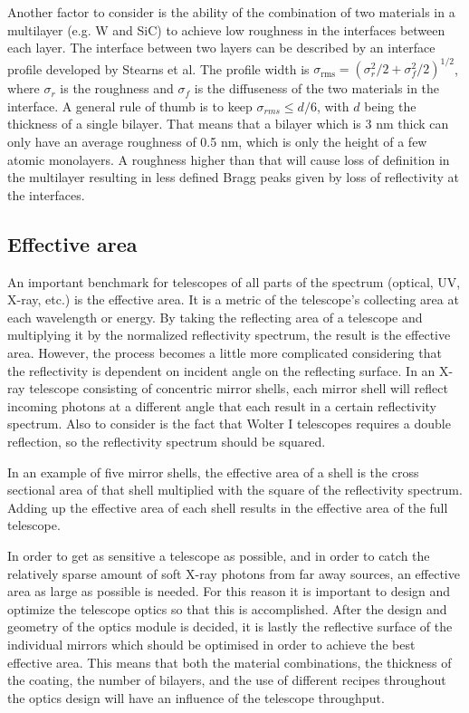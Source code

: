 Another factor to consider is the ability of the combination of two materials in a multilayer (e.g. W and SiC) to achieve low roughness in the interfaces between each layer. The interface between two layers can be described by an interface profile developed by Stearns et al\cite{Stearns:1989va}. The profile width is $\sigma_{\text{rms}}=(\sigma_r^2/2 + \sigma_f^2/2)^{1/2}$, where $\sigma_r$ is the roughness and $\sigma_f$ is the diffuseness of the two materials in the interface. A general rule of thumb is to keep $\sigma_{rms} \leq d/6$, with $d$ being the thickness of a single bilayer. That means that a bilayer which is 3 nm thick can only have an average roughness of 0.5 nm, which is only the height of a few atomic monolayers. A roughness higher than that will cause loss of definition in the multilayer resulting in less defined Bragg peaks given by loss of reflectivity at the interfaces.

\subsection{Effective area}\label{sec:eff_area}
An important benchmark for telescopes of all parts of the spectrum (optical, UV, X-ray, etc.) is the effective area. It is a metric of the telescope's collecting area at each wavelength or energy. By taking the reflecting area of a telescope and multiplying it by the normalized reflectivity spectrum, the result is the effective area. However, the process becomes a little more complicated considering that the reflectivity is dependent on incident angle on the reflecting surface. In an X-ray telescope consisting of concentric mirror shells, each mirror shell will reflect incoming photons at a different angle that each result in a certain reflectivity spectrum. Also to consider is the fact that Wolter I telescopes requires a double reflection, so the reflectivity spectrum should be squared.

In an example of five mirror shells, the effective area of a shell is the cross sectional area of that shell multiplied with the square of the reflectivity spectrum. Adding up the effective area of each shell results in the effective area of the full telescope.

In order to get as sensitive a telescope as possible, and in order to catch the relatively sparse amount of soft X-ray photons from far away sources, an effective area as large as possible is needed. For this reason it is important to design and optimize the telescope optics so that this is accomplished. After the design and geometry of the optics module is decided, it is lastly the reflective surface of the individual mirrors which should be optimised in order to achieve the best effective area. This means that both the material combinations, the thickness of the coating, the number of bilayers, and the use of different recipes throughout the optics design will have an influence of the telescope throughput.

